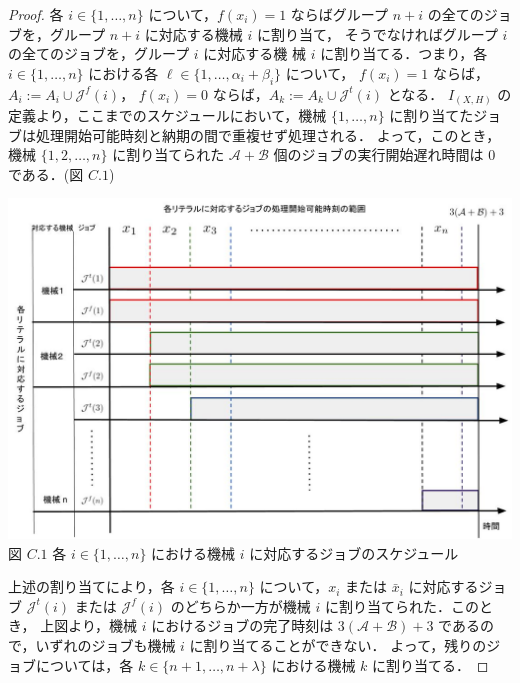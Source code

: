 \documentclass[12pt]{optlab-bachelor}
\begin{document}
\begin{proof}
  各 $i \in \{1,\ldots, n\}$ について，$f(x_i) = 1$ ならばグループ $n +
  i$ の全てのジョブを，グループ $n + i$ に対応する機械 $i$ に割り当て，
  そうでなければグループ $i$ の全てのジョブを，グループ $i$ に対応する機
  械 $i$ に割り当てる．つまり，各 $i \in \{1,\ldots, n\}$ における各
  $\ell \in \{1,\ldots,\alpha_i + \beta_i\}$ について，
  $f(x_i) = 1$ ならば，$A_i := A_i \cup \mathcal{J}^f(i)$，
  $f(x_i) = 0$ ならば，$A_k := A_k \cup \mathcal{J}^t(i)$ となる．
  $I_{(X,H)}$ の定義より，ここまでのスケジュールにおいて，機械
  $\{1,\ldots, n\}$ に割り当てたジョブは処理開始可能時刻と納期の間で重複せず処理される．
  よって，このとき，機械 $\{1,2,\ldots,n\}$ に割り当てられた
  $\mathcal{A} + \mathcal{B}$ 個のジョブの実行開始遅れ時間は $0$ である．(図 $C.1$)
  \begin{center}
    \includegraphics[width = 15cm]{3SAT1.jpg}\\
    図 $C.1$ 各 $i \in \{1,\ldots,n\}$ における機械 $i$ に対応するジョブのスケジュール
  \end{center}


  上述の割り当てにより，各 $i \in \{1,\ldots,n\}$ について，$x_i$ または
  $\bar x_i$ に対応するジョブ $\mathcal{J}^t(i)$ または
  $\mathcal{J}^f(i)$ のどちらか一方が機械 $i$ に割り当てられた．このとき，
  上図より，機械 $i$ におけるジョブの完了時刻は $3(\mathcal{A} +
  \mathcal{B}) + 3$ であるので，いずれのジョブも機械 $i$ に割り当てることができない．
  よって，残りのジョブについては，各 $k \in \{n + 1,\ldots,n +
  \lambda\}$ における機械 $k$ に割り当てる．


\end{proof}
\end{document}
